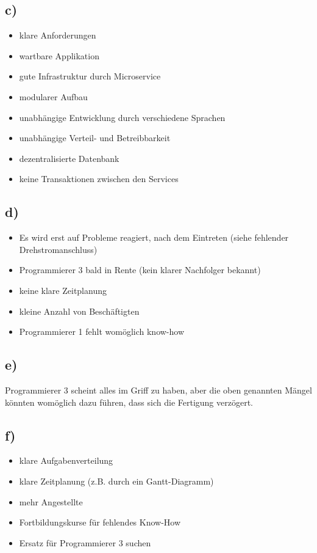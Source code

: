 \documentclass[12pt,pdftex,a4paper]{article}
\begin{document}
\subsection*{c)}
\begin{itemize}
\item klare Anforderungen
\item wartbare Applikation
\item gute Infrastruktur durch Microservice
\item modularer Aufbau
\item unabhängige Entwicklung durch verschiedene Sprachen
\item unabhängige Verteil- und Betreibbarkeit
\item dezentralisierte Datenbank
\item keine Transaktionen zwischen den Services
\end{itemize}
\subsection*{d)}
\begin{itemize}
\item Es wird erst auf Probleme reagiert, nach dem Eintreten (siehe fehlender Drehstromanschluss)
\item Programmierer 3 bald in Rente (kein klarer Nachfolger bekannt)
\item keine klare Zeitplanung
\item kleine Anzahl von Beschäftigten
\item Programmierer 1 fehlt womöglich know-how
\end{itemize}
\subsection*{e)}
Programmierer 3 scheint alles im Griff zu haben, aber die oben genannten Mängel könnten womöglich dazu führen, dass sich die Fertigung verzögert.
\subsection*{f)}
\begin{itemize}
\item klare Aufgabenverteilung
\item klare Zeitplanung (z.B. durch ein Gantt-Diagramm)
\item mehr Angestellte
\item Fortbildungskurse für fehlendes Know-How
\item Ersatz für Programmierer 3 suchen
\end{itemize}
\end{document}
